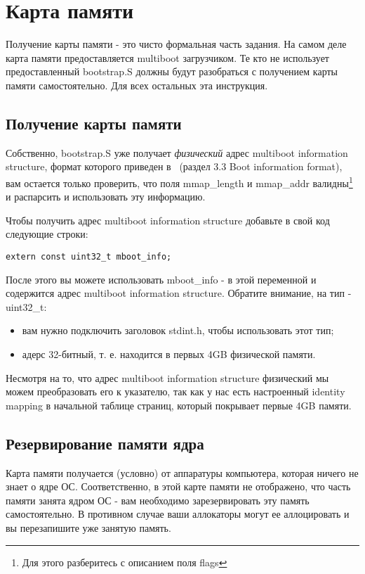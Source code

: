 \section{Карта памяти}

Получение карты памяти - это чисто формальная часть задания. На самом деле
карта памяти предоставляется multiboot загрузчиком. Те кто не использует
предоставленный bootstrap.S должны будут разобраться с получением карты памяти
самостоятельно. Для всех остальных эта инструкция.

\subsection{Получение карты памяти}

Собственно, bootstrap.S уже получает \emph{физический} адрес multiboot
information structure, формат которого приведен в~\cite{multiboot} (раздел 3.3
Boot information format), вам остается только проверить, что поля mmap\_length и
mmap\_addr валидны\footnote{Для этого разберитесь с описанием поля flags} и
распарсить и использовать эту информацию.

Чтобы получить адрес multiboot information structure добавьте в свой код
следующие строки:

\begin{lstlisting}
extern const uint32_t mboot_info;
\end{lstlisting}

После этого вы можете использовать mboot\_info - в этой переменной и содержится
адрес multiboot information structure. Обратите внимание, на тип - uint32\_t:
\begin{itemize}
  \item вам нужно подключить заголовок stdint.h, чтобы использовать этот тип;
  \item адерс 32-битный, т. е. находится в первых 4GB физической памяти.
\end{itemize}

Несмотря на то, что адрес multiboot information structure физический мы можем
преобразовать его к указателю, так как у нас есть настроенный identity mapping
в начальной таблице страниц, который покрывает первые 4GB памяти.

\subsection{Резервирование памяти ядра}

Карта памяти получается (условно) от аппаратуры компьютера, которая ничего не
знает о ядре ОС. Соответственно, в этой карте памяти не отображено, что часть
памяти занята ядром ОС - вам необходимо зарезервировать эту память
самостоятельно. В противном случае ваши аллокаторы могут ее аллоцировать и вы
перезапишите уже занятую память.

